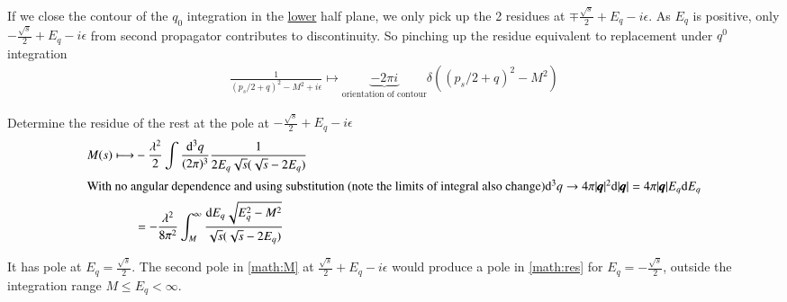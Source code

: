 \begin{center}
\end{center}

If we close the contour of the $q_0$ integration in the \underline{lower} half plane, we only pick up the 2 residues at $\mp \frac{\sqrt{s}}{2}+E_q -i\epsilon$. As $E_q$ is positive, only $-\frac{\sqrt{s}}{2} + E_q -i \epsilon$ from second propagator contributes to discontinuity. So pinching up the residue equivalent to replacement under $q^0$ integration
\begin{align*}
	\frac{1}{(p_s /2 + q)^2 - M^2 +i\epsilon} \longmapsto  \underbrace{-2\pi i}_{\text{orientation of contour}} \delta((p_s / 2 + q)^2 - M^2)
\end{align*}

Determine the residue of the rest at the pole at $-\frac{\sqrt{s}}{2} + E_q  - i\epsilon$
\begin{align}
	M(s) \longmapsto &-\frac{\lambda^2}{2} \int \frac{\dd^3 q}{(2\pi)^3} \frac{1}{2E_q \sqrt{s}(\sqrt{s}-2E_q)} \notag \\
	\shortintertext{With no angular dependence and using substitution (note the limits of integral also change)$\dd^3 q \rightarrow 4 \pi |\pmb{q}|^2 \dd |\pmb{q}| = 4 \pi |\pmb{q}|E_q \dd E_q$}
	& = -\frac{\lambda^2}{8\pi^2} \int^\infty_M \frac{\dd E_q \sqrt{E_q^2 - M^2}}{\sqrt{s}(\sqrt{s} - 2E_q)}  \label{math:res}
\end{align}

It has pole at $E_q = \frac{\sqrt{s}}{2}$. The second pole in \ref{math:M} at $\frac{\sqrt{s}}{2} + E_q - i\epsilon$ would produce a pole in \ref{math:res} for $E_q = -\frac{\sqrt{s}}{2}$, outside the integration range $M \leq E_q < \infty$.

